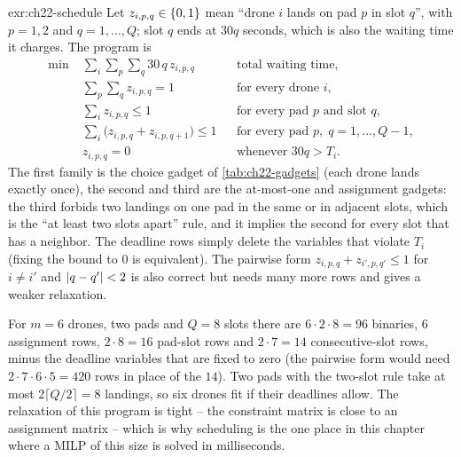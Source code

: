 \begin{solution}{exr:ch22-schedule}
Let $z_{i,p,q} \in \left\{ 0,1 \right\}$ mean ``drone $i$ lands on pad $p$ in slot
$q$'', with $p = 1, 2$ and $q = 1, \dots, Q$; slot $q$ ends at $30q$
seconds, which is also the waiting time it charges. The program is
\begin{align*}
  \min \; & \sum_{i} \sum_{p} \sum_{q} 30\, q\, z_{i,p,q}
    && \text{total waiting time},\\
  & \sum_{p} \sum_{q} z_{i,p,q} = 1 && \text{for every drone } i,\\
  & \sum_{i} z_{i,p,q} \le 1 && \text{for every pad } p \text{ and slot } q,\\
  & \sum_{i} \bigl(z_{i,p,q} + z_{i,p,q+1}\bigr) \le 1
    && \text{for every pad } p,\; q = 1, \dots, Q-1,\\
  & z_{i,p,q} = 0 && \text{whenever } 30 q > T_i.
\end{align*}
The first family is the choice gadget of \cref{tab:ch22-gadgets} (each
drone lands exactly once), the second and third are the at-most-one and
assignment gadgets: the third forbids two landings on one pad in the same
or in adjacent slots, which is the ``at least two slots apart'' rule, and
it implies the second for every slot that has a neighbor. The deadline
rows simply delete the variables that violate $T_i$ (fixing the bound to
$0$ is equivalent). The pairwise form $z_{i,p,q} + z_{i',p,q'} \le 1$ for
$i \ne i'$ and $\left\lvert q - q' \right\rvert < 2$ is also correct but needs many more rows
and gives a weaker relaxation.

For $m = 6$ drones, two pads and $Q = 8$ slots there are $6 \cdot 2 \cdot 8
= 96$ binaries, $6$ assignment rows, $2 \cdot 8 = 16$ pad-slot rows and
$2 \cdot 7 = 14$ consecutive-slot rows, minus the deadline variables that
are fixed to zero (the pairwise form would need $2 \cdot 7 \cdot 6 \cdot 5
= 420$ rows in place of the $14$). Two pads with the two-slot rule take at
most $2 \lceil Q/2 \rceil = 8$ landings, so six drones fit if their
deadlines allow. The relaxation of this program is tight -- the constraint
matrix is close to an assignment matrix -- which is why scheduling is the
one place in this chapter where a MILP of this size is solved in
milliseconds.
\end{solution}

